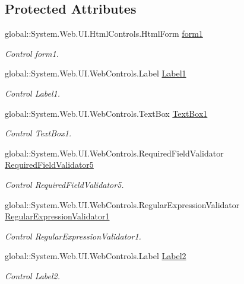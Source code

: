 \subsection*{Protected Attributes}
\begin{DoxyCompactItemize}
\item 
global\+::\+System.\+Web.\+U\+I.\+Html\+Controls.\+Html\+Form \mbox{\hyperlink{class_inicio_1_1_registro_a0b8d260039acc63632a758544652ea24}{form1}}
\begin{DoxyCompactList}\small\item\em Control form1. \end{DoxyCompactList}\item 
global\+::\+System.\+Web.\+U\+I.\+Web\+Controls.\+Label \mbox{\hyperlink{class_inicio_1_1_registro_a4ec239a90d4abd7bfd75de6f88d318c9}{Label1}}
\begin{DoxyCompactList}\small\item\em Control Label1. \end{DoxyCompactList}\item 
global\+::\+System.\+Web.\+U\+I.\+Web\+Controls.\+Text\+Box \mbox{\hyperlink{class_inicio_1_1_registro_ab767617adc8dcd13a78c70824d55eb24}{Text\+Box1}}
\begin{DoxyCompactList}\small\item\em Control Text\+Box1. \end{DoxyCompactList}\item 
global\+::\+System.\+Web.\+U\+I.\+Web\+Controls.\+Required\+Field\+Validator \mbox{\hyperlink{class_inicio_1_1_registro_af4f83864caf67319997d2b41fb4298b2}{Required\+Field\+Validator5}}
\begin{DoxyCompactList}\small\item\em Control Required\+Field\+Validator5. \end{DoxyCompactList}\item 
global\+::\+System.\+Web.\+U\+I.\+Web\+Controls.\+Regular\+Expression\+Validator \mbox{\hyperlink{class_inicio_1_1_registro_a1d327341db3c92117be1c5e828fe2bf9}{Regular\+Expression\+Validator1}}
\begin{DoxyCompactList}\small\item\em Control Regular\+Expression\+Validator1. \end{DoxyCompactList}\item 
global\+::\+System.\+Web.\+U\+I.\+Web\+Controls.\+Label \mbox{\hyperlink{class_inicio_1_1_registro_ae7b4e658b3d377fe9acc4b4930616dae}{Label2}}
\begin{DoxyCompactList}\small\item\em Control Label2. \end{DoxyCompactList}\item 

\end{DoxyCompactItemize}

